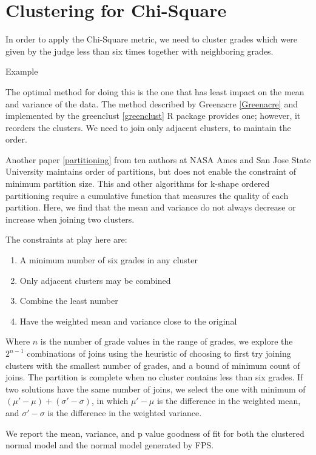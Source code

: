 \section{Clustering for Chi-Square}

In order to apply the Chi-Square metric, we need to cluster grades which
were given by the judge less than six times together with neighboring
grades.

Example

The optimal method for doing this is the one that has least impact on
the mean and variance of the data. The method described by
Greenacre \ref{Greenacre}
and implemented by the
greenclust \ref{greenclust}
R package provides one; however, it reorders the clusters.
We need to join only adjacent clusters, to maintain the order.

Another paper
\ref {partitioning}
from ten authors at NASA Ames and San Jose State University
maintains order of partitions, but does not enable the constraint of
minimum partition size. This and other algorithms for k-shape
ordered partitioning require a cumulative
function that measures the quality of each partition.
Here, we find that the mean and variance do not always decrease or
increase when joining two clusters.

The constraints at play here are:
\begin{enumerate}
\item{A minimum number of six grades in any cluster}
\item{Only adjacent clusters may be combined}
\item{Combine the least number}
\item{Have the weighted mean and variance close to the original}
\end{enumerate}

Where $n$ is the number of grade values in the range of grades,
we explore the $2^{n-1}$ combinations of joins using the heuristic
of choosing to first try joining clusters with the smallest number of grades,
and a bound of minimum count of joins. The partition
is complete when no cluster contains less than six grades. If two solutions
have the same number of joins, we select the one with minimum of
$(\mu' - \mu) + (\sigma' - \sigma)$, in which
$\mu' - \mu$ is
the difference in the weighted mean, and
$\sigma' - \sigma$ is
the difference in the weighted variance.

We report the mean, variance, and p value goodness of fit
for both the clustered normal model and the normal model generated by FPS.

